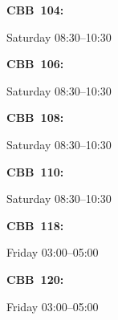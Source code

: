 \documentclass[11pt,oneside,letter]{article}
\begin{document}
\begin{center}
{\LARGE {\bf CBB~104:}}
\end{center}

\begin{center}
{\large Saturday 08:30--10:30}
\end{center}


\newpage



\begin{center}
{\LARGE {\bf CBB~106:}}
\end{center}

\begin{center}
{\large Saturday 08:30--10:30}
\end{center}

\newpage


\begin{center}
{\LARGE {\bf CBB~108:}}
\end{center}

\begin{center}
{\large Saturday 08:30--10:30}
\end{center}

\newpage


\begin{center}
{\LARGE {\bf CBB~110:}}
\end{center}

\begin{center}
{\large Saturday 08:30--10:30}
\end{center}

\newpage




\begin{center}
{\LARGE {\bf CBB~118:}}
\end{center}

\begin{center}
{\large Friday 03:00--05:00}
\end{center}


\newpage





\begin{center}
{\LARGE {\bf CBB~120:}}
\end{center}

\begin{center}
{\large Friday 03:00--05:00}
\end{center}

\end{document}
